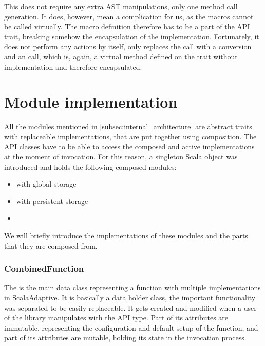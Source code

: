 This does not require any extra AST manipulations, only one method call generation. It does, however, mean a complication for us, as the macros cannot be called virtually. The macro definition therefore has to be a part of the  API trait, breaking somehow the encapsulation of the implementation. Fortunately, it does not perform any actions by itself, only replaces the  call with a conversion and an  call, which is, again, a virtual method defined on the trait without implementation and therefore encapsulated.


\section{Module implementation}
\label{sec:module_impl}

All the modules mentioned in \ref{subsec:internal_architecture} are abstract traits with replaceable implementations, that are put together using composition. The API classes have to be able to access the composed and active implementations at the moment of invocation. For this reason, a singleton Scala object  was introduced and holds the following composed modules:

\begin{itemize}
	\item {} with global storage
	\item {} with persistent storage
	\item {}
\end{itemize}

We will briefly introduce the implementations of these modules and the parts that they are composed from.

\subsubsection{CombinedFunction}

The  is the main data class representing a function with multiple implementations in ScalaAdaptive. It is basically a data holder class, the important functionality was separated to be easily replaceable. It gets created and modified when a user of the library manipulates with the  API type. Part of its attributes are immutable, representing the configuration and default setup of the function, and part of its attributes are mutable, holding its state in the invocation process.

